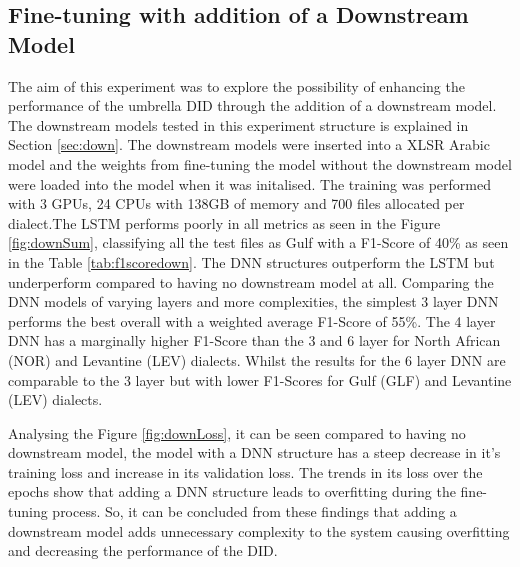 \subsection{Fine-tuning with addition of a Downstream Model}\label{sect:downExp}
The aim of this experiment was to explore the possibility of enhancing the performance of the umbrella DID through 
the addition of a downstream model. The downstream models tested in this experiment structure is explained in Section \ref{sec:down}. The downstream models were inserted 
into a XLSR Arabic model and the weights from fine-tuning the model without the downstream model were loaded into the model when it was initalised. The training was performed with 3 GPUs, 24 CPUs with 138GB of memory 
and 700 files allocated per dialect.The LSTM performs poorly in all metrics as seen in the Figure \ref{fig:downSum}, classifying all the test files as Gulf with a F1-Score of 40\% as seen in the Table \ref{tab:f1scoredown}. 
The DNN structures outperform the LSTM but underperform compared to having no downstream model at all. Comparing the DNN models of varying layers and more complexities, the simplest 3 layer DNN performs the best overall with a weighted average F1-Score of 55\%. 
The 4 layer DNN has a marginally higher F1-Score than the 3 and 6 layer for North African (NOR) and Levantine (LEV) dialects. Whilst the results for the 
6 layer DNN are comparable to the 3 layer but with lower F1-Scores for Gulf (GLF) and Levantine (LEV) dialects. 

Analysing the Figure \ref{fig:downLoss}, it can be seen compared to having no downstream model, the model with a DNN structure has a steep 
decrease in it's training loss and increase in its validation loss. The trends in its loss over the epochs show that adding a DNN structure leads to overfitting 
during the fine-tuning process. So, it can be concluded from these findings that adding a downstream model adds unnecessary complexity to the system 
causing overfitting and decreasing the performance of the DID.  

